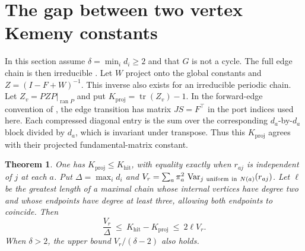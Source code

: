 \documentclass[11pt]{article}
\newtheorem{theorem}{Theorem}
\newcommand{\kh}{K_{\mathrm{hit}}}
\newcommand{\kp}{K_{\mathrm{proj}}}
\newcommand{\var}{\operatorname{Var}}
\newcommand{\ran}{\operatorname{ran}}
\newcommand{\tr}{\operatorname{tr}}
\begin{document}
\section{The gap between two vertex Kemeny constants}\label{sec:trace}
In this section assume $\delta=\min_i d_i\ge2$ and that $G$ is not a
cycle. The full edge chain is then irreducible \cite[Lemma~3.1]{OW}.
Let $W$ project onto the global constants and $Z=(I-F+W)^{-1}$.
This inverse also exists for an irreducible periodic chain. Let
$Z_v=PZP|_{\ran P}$ and put $\kp=\tr(Z_v)-1$. In the forward-edge
convention of \cite[Def.~3.6]{BKKS}, the edge transition has matrix
$JS=F^\top$ in the port indices used here. Each compressed diagonal
entry is the sum over the corresponding $d_a$-by-$d_a$ block divided by
$d_a$, which is invariant under transpose. Thus this $\kp$ agrees with
their projected fundamental-matrix constant.

\begin{theorem}\label{thm:trace}
One has $\kp\le\kh$, with equality exactly when $r_{aj}$ is independent
of $j$ at each $a$. Put $\Delta=\max_i d_i$ and
$V_r=\sum_a\pi_a^2\,\var_{j\ {\rm uniform\ in}\ N(a)}(r_{aj})$.
Let $\ell$ be the greatest length of a maximal chain whose internal
vertices have degree two and whose endpoints have degree at least three,
allowing both endpoints to coincide. Then
\[
 \frac{V_r}{\Delta}\ \le\ \kh-\kp\ \le\ 2\ell V_r .
\]
When $\delta>2$, the upper bound $V_r/(\delta-2)$ also holds.
\end{theorem}
\end{document}
